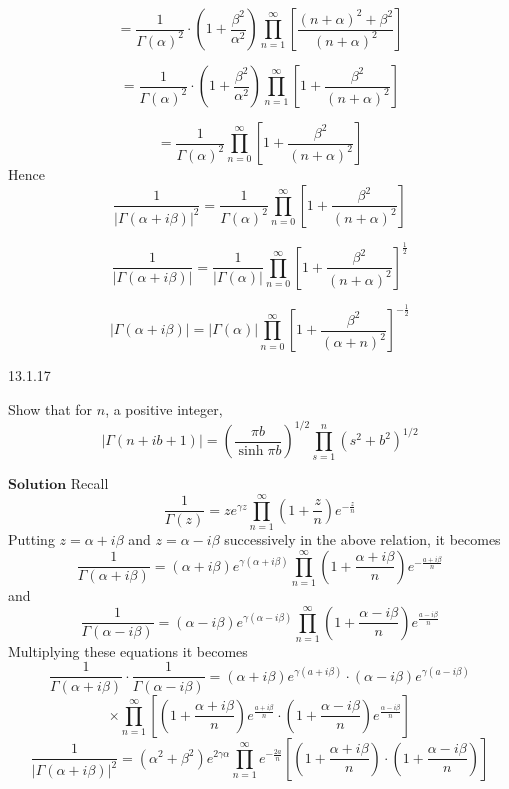 \documentclass{article}
\begin{document}
\begin{flushleft}
$$
=\frac{1}{\Gamma(\alpha)^{2}} \cdot\left(1+\frac{\beta^{2}}{\alpha^{2}}\right) \prod_{n=1}^{\infty}\left[\frac{(n+\alpha)^{2}+\beta^{2}}{(n+\alpha)^{2}}\right]
$$

$$
=\frac{1}{\Gamma(\alpha)^{2}} \cdot\left(1+\frac{\beta^{2}}{\alpha^{2}}\right) \prod_{n=1}^{\infty}\left[1+\frac{\beta^{2}}{(n+\alpha)^{2}}\right]
$$

$$
=\frac{1}{\Gamma(\alpha)^{2}} \prod_{n=0}^{\infty}\left[1+\frac{\beta^{2}}{(n+\alpha)^{2}}\right]
$$
Hence
$$
\frac{1}{|\Gamma(\alpha+i \beta)|^{2}}=\frac{1}{\Gamma(\alpha)^{2}} \prod_{n=0}^{\infty}\left[1+\frac{\beta^{2}}{(n+\alpha)^{2}}\right]
$$

$$
\frac{1}{|\Gamma(\alpha+i \beta)|}=\frac{1}{|\Gamma(\alpha)|} \prod_{n=0}^{\infty}\left[1+\frac{\beta^{2}}{(n+\alpha)^{2}}\right]^{\frac{1}{2}}
$$

$$
|\Gamma(\alpha+i \beta)|=|\Gamma(\alpha)| \prod_{n=0}^{\infty}\left[1+\frac{\beta^{2}}{(\alpha+n)^{2}}\right]^{-\frac{1}{2}}
$$



\newpage

\begin{mybox}{13.1.17}

Show that for $n$, a positive integer,
$$
|\Gamma(n+i b+1)|=\left(\frac{\pi b}{\sinh \pi b}\right)^{1 / 2} \prod_{s=1}^{n}\left(s^{2}+b^{2}\right)^{1 / 2}
$$
\end{mybox}

$\boxed{\textbf{Solution}}$ Recall 
$$
\frac{1}{\Gamma(z)}=z e^{\gamma z} \prod_{n=1}^{\infty}\left(1+\frac{z}{n}\right) e^{-\frac{z}{n}}
$$
Putting $z=\alpha+i \beta$ and $z=\alpha-i \beta$ successively in the above relation, it becomes
$$
\frac{1}{\Gamma(\alpha+i \beta)}=(\alpha+i \beta) e^{\gamma(\alpha+i \beta)} \prod_{n=1}^{\infty}\left(1+\frac{\alpha+i \beta}{n}\right) e^{-\frac{a+i \beta}{n}}
$$
and 
$$
\frac{1}{\Gamma(\alpha-i \beta)}=(\alpha-i \beta) e^{\gamma(\alpha-i \beta)} \prod_{n=1}^{\infty}\left(1+\frac{\alpha-i \beta}{n}\right) e^{\frac{a-i \beta}{n}}
$$
Multiplying these equations it becomes
$$
\frac{1}{\Gamma(\alpha+i \beta)} \cdot \frac{1}{\Gamma(\alpha-i \beta)}=(\alpha+i \beta) e^{\gamma(a+i \beta)} \cdot(\alpha-i \beta) e^{\gamma(a-i \beta)}$$
$$\times \prod_{n=1}^{\infty}\left[\left(1+\frac{\alpha+i \beta}{n}\right) e^{\frac{a+i \beta}{n}} \cdot\left(1+\frac{\alpha-i \beta}{n}\right) e^{\frac{\alpha-i \beta}{n}}\right]
$$
$$
\frac{1}{|\Gamma(\alpha+i \beta)|^{2}}=\left(\alpha^{2}+\beta^{2}\right) e^{2\gamma \alpha} \prod_{n=1}^{\infty} e^{-\frac{2 a}{n}}\left[\left(1+\frac{\alpha+i \beta}{n}\right) \cdot\left(1+\frac{\alpha-i \beta}{n}\right)\right]
$$


\end{flushleft}
\end{document}
